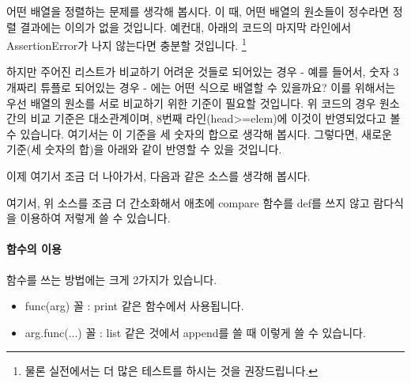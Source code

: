 \documentclass[twoside]{article}
\begin{document}
어떤 배열을 정렬하는 문제를 생각해 봅시다. 이 때, 어떤 배열의 원소들이 정수라면 정렬 결과에는 이의가 없을 것입니다. 예컨대, 아래의 코드의 마지막 라인에서 AssertionError가 나지 않는다면 충분할 것입니다. \footnote{물론 실전에서는 더 많은 테스트를 하시는 것을 권장드립니다.}





하지만 주어진 리스트가 비교하기 어려운 것들로 되어있는 경우 - 예를 들어서, 숫자 3개짜리 튜플로 되어있는 경우 - 에는 어떤 식으로 배열할 수 있을까요? 이를 위해서는 우선 배열의 원소를 서로 비교하기 위한 기준이 필요할 것입니다. 위 코드의 경우 원소간의 비교 기준은 대소관계이며, 8번째 라인(head>=elem)에 이것이 반영되었다고 볼 수 있습니다. 여기서는 이 기준을 세 숫자의 합으로 생각해 봅시다. 그렇다면, 새로운 기준(세 숫자의 합)을 아래와 같이 반영할 수 있을 것입니다. 




이제 여기서 조금 더 나아가서, 다음과 같은 소스를 생각해 봅시다. 



여기서, 위 소스를 조금 더 간소화해서 애초에 compare 함수를 def를 쓰지 않고 람다식을 이용하여 저렇게 쓸 수 있습니다. 


                
                
\paragraph{함수의 이용} 함수를 쓰는 방법에는 크게 2가지가 있습니다. 

\begin{itemize} 
\item func(arg) 꼴 : print 같은 함수에서 사용됩니다. 
\item arg.func(...) 꼴 : list 같은 것에서 append를 쓸 때 이렇게 쓸 수 있습니다. 
\end{itemize}




\end{document}
